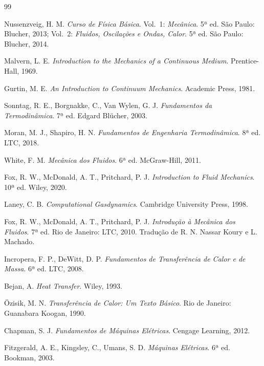 \documentclass[12pt,a4paper]{article}
\numberwithin{equation}{section}
\numberwithin{table}{section}
\numberwithin{figure}{section}
\begin{document}
{\clearpage
{}
{}
\listoftables

\newpage
\begin{thebibliography}{99}

 Nussenzveig, H. M. \textit{Curso de Física Básica}. Vol.~1: \textit{Mecânica}. 5ª ed. São Paulo: Blucher, 2013; Vol.~2: \textit{Fluidos, Oscilações e Ondas, Calor}. 5ª ed. São Paulo: Blucher, 2014.

 Malvern, L. E. \textit{Introduction to the Mechanics of a Continuous Medium}. Prentice-Hall, 1969.

 Gurtin, M. E. \textit{An Introduction to Continuum Mechanics}. Academic Press, 1981.

 Sonntag, R. E., Borgnakke, C., Van Wylen, G. J. \textit{Fundamentos da Termodinâmica}. 7ª ed. Edgard Blücher, 2003.

 Moran, M. J., Shapiro, H. N. \textit{Fundamentos de Engenharia Termodinâmica}. 8ª ed. LTC, 2018.

 White, F. M. \textit{Mecânica dos Fluidos}. 6ª ed. McGraw-Hill, 2011.

 Fox, R. W., McDonald, A. T., Pritchard, P. J. \textit{Introduction to Fluid Mechanics}. 10ª ed. Wiley, 2020.

 Laney, C. B. \textit{Computational Gasdynamics}. Cambridge University Press, 1998.

 Fox, R. W., McDonald, A. T., Pritchard, P. J. \textit{Introdução à Mecânica dos Fluidos}. 7ª ed. Rio de Janeiro: LTC, 2010. Tradução de R. N. Nassar Koury e L. Machado.

 Incropera, F. P., DeWitt, D. P. \textit{Fundamentos de Transferência de Calor e de Massa}. 6ª ed. LTC, 2008.

 Bejan, A. \textit{Heat Transfer}. Wiley, 1993.

 Özisik, M. N. \textit{Transferência de Calor: Um Texto Básico}. Rio de Janeiro: Guanabara Koogan, 1990.

 Chapman, S. J. \textit{Fundamentos de Máquinas Elétricas}. Cengage Learning, 2012.

 Fitzgerald, A. E., Kingsley, C., Umans, S. D. \textit{Máquinas Elétricas}. 6ª ed. Bookman, 2003.


\end{thebibliography}}
\end{document}
